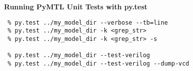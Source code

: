 \documentclass{cbxdoc}
\begin{document}
\begin{landscape}
\begin{minipage}[t]{3.25in}
\vspace{0.15in}
\colorbox{gray!30!white}{\parbox{1.025\tw}{\rule[-0.4em]{0pt}{1.4em}\centering\textbf{%
  Running PyMTL Unit Tests with py.test%
}}}

\vspace{0.1in}
\begin{verbatim}
 % py.test ../my_model_dir --verbose --tb=line
 % py.test ../my_model_dir -k <grep_str>
 % py.test ../my_model_dir -k <grep_str> -s

 % py.test ../my_model_dir --test-verilog
 % py.test ../my_model_dir --test-verilog --dump-vcd
\end{verbatim}

\end{minipage}%
\par

\end{landscape}
\end{document}
